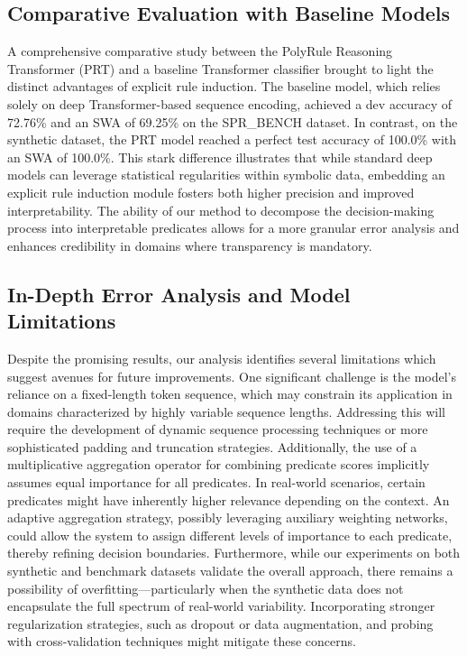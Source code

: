\documentclass{article}
\begin{document}
\subsection*{Comparative Evaluation with Baseline Models}
A comprehensive comparative study between the PolyRule Reasoning Transformer (PRT) and a baseline Transformer classifier brought to light the distinct advantages of explicit rule induction. The baseline model, which relies solely on deep Transformer-based sequence encoding, achieved a dev accuracy of 72.76\% and an SWA of 69.25\% on the SPR\_BENCH dataset. In contrast, on the synthetic dataset, the PRT model reached a perfect test accuracy of 100.0\% with an SWA of 100.0\%. This stark difference illustrates that while standard deep models can leverage statistical regularities within symbolic data, embedding an explicit rule induction module fosters both higher precision and improved interpretability. The ability of our method to decompose the decision-making process into interpretable predicates allows for a more granular error analysis and enhances credibility in domains where transparency is mandatory.

\subsection*{In-Depth Error Analysis and Model Limitations}
Despite the promising results, our analysis identifies several limitations which suggest avenues for future improvements. One significant challenge is the model's reliance on a fixed-length token sequence, which may constrain its application in domains characterized by highly variable sequence lengths. Addressing this will require the development of dynamic sequence processing techniques or more sophisticated padding and truncation strategies. Additionally, the use of a multiplicative aggregation operator for combining predicate scores implicitly assumes equal importance for all predicates. In real-world scenarios, certain predicates might have inherently higher relevance depending on the context. An adaptive aggregation strategy, possibly leveraging auxiliary weighting networks, could allow the system to assign different levels of importance to each predicate, thereby refining decision boundaries. Furthermore, while our experiments on both synthetic and benchmark datasets validate the overall approach, there remains a possibility of overfitting—particularly when the synthetic data does not encapsulate the full spectrum of real-world variability. Incorporating stronger regularization strategies, such as dropout or data augmentation, and probing with cross-validation techniques might mitigate these concerns.
\end{document}
